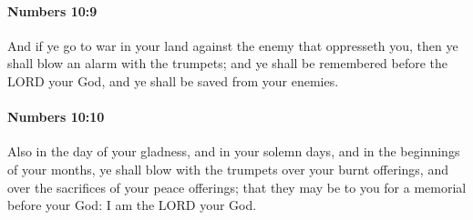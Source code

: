 		\paragraph{Numbers 10:9} %
			\label{NUMBERS-10-9}

			And if ye go to war in your land against the enemy that oppresseth you, then ye shall blow an alarm with the trumpets; and ye shall be remembered before the LORD your God, and ye shall be saved from your enemies.


		\paragraph{Numbers 10:10} %
			\label{NUMBERS-10-10}

			Also in the day of your gladness, and in your solemn days, and in the beginnings of your months, ye shall blow with the trumpets over your burnt offerings, and over the sacrifices of your peace offerings; that they may be to you for a memorial before your God: I am the LORD your God.

